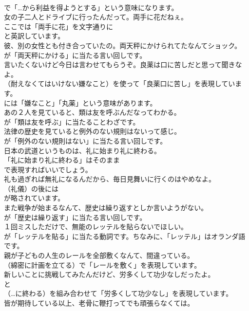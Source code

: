 \documentclass[8pt]{extreport}
\begin{document}
\begin{CJK}{UTF8}{min}
\\	で「…から利益を得ようとする」という意味になります。	
\\	女の子二人とドライブに行ったんだって。両手に花だねぇ。 
\\	ここでは「両手に花」を文字通りに
\\	と英訳しています。	
\\	彼、別の女性とも付き合っていたの。両天秤にかけられてたなんてショック。 
\\	が「両天秤にかける」に当たる言い回しです。	
\\	言いたくないけど今日は言わせてもらうぞ。良薬は口に苦しだと思って聞きなよ。 
\\	（耐えなくてはいけない嫌なこと）を使って「良薬口に苦し」を表現しています。
\\	には「嫌なこと」「丸薬」という意味があります。	
\\	あの２人を見ていると、類は友を呼ぶんだなってわかる。 
\\	が「類は友を呼ぶ」に当たることわざです。	
\\	法律の歴史を見ていると例外のない規則はないって感じ。 
\\	が「例外のない規則はない」に当たる言い回しです。	
\\	日本の武道というものは、礼に始まり礼に終わる。 
\\	「礼に始まり礼に終わる」はそのまま 
\\	で表現すればいいでしょう。	
\\	礼も過ぎれば無礼になるんだから、毎日見舞いに行くのはやめなよ。 
\\	（礼儀）の後には 
\\	が略されています。	
\\	また戦争が始まるなんて、歴史は繰り返すとしか言いようがない。 
\\	が「歴史は繰り返す」に当たる言い回しです。	
\\	１回ミスしただけで、無能のレッテルを貼らないでほしい。 
\\	が「レッテルを貼る」に当たる動詞です。ちなみに、「レッテル」はオランダ語です。	
\\	親が子どもの人生のレールを全部敷くなんて、間違っている。 
\\	（綿密に計画を立てる）で「レールを敷く」を表現しています。	
\\	新しいことに挑戦してみたんだけど、労多くして功少なしだったよ。 
\\	と
\\	（…に終わる）を組み合わせて「労多くして功少なし」を表現しています。	
\\	皆が期待している以上、老骨に鞭打ってでも頑張らなくては。 

\end{CJK}
\end{document}
